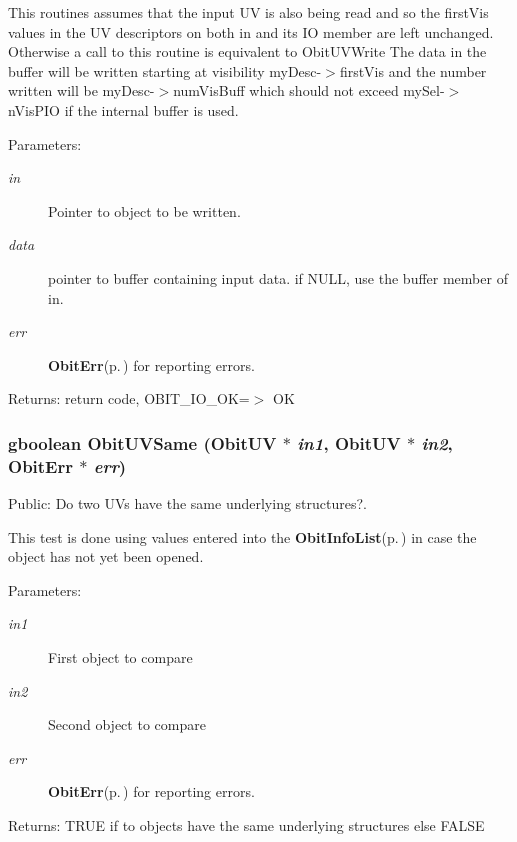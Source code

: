 This routines assumes that the input UV is also being read and so the first\-Vis values in the UV descriptors on both in and its IO member are left unchanged. Otherwise a call to this routine is equivalent to Obit\-UVWrite The data in the buffer will be written starting at visibility my\-Desc-$>$first\-Vis and the number written will be my\-Desc-$>$num\-Vis\-Buff which should not exceed my\-Sel-$>$n\-Vis\-PIO if the internal buffer is used. \begin{Desc}
\item[Parameters:]
\begin{description}
\item[{\em in}]Pointer to object to be written. \item[{\em data}]pointer to buffer containing input data. if NULL, use the buffer member of in. \item[{\em err}]{\bf Obit\-Err}{\rm (p.\,\pageref{structObitErr})} for reporting errors. \end{description}
\end{Desc}
\begin{Desc}
\item[Returns:]return code, OBIT\_\-IO\_\-OK=$>$ OK \end{Desc}
\subsubsection{\setlength{\rightskip}{0pt plus 5cm}gboolean Obit\-UVSame ({\bf Obit\-UV} $\ast$ {\em in1}, {\bf Obit\-UV} $\ast$ {\em in2}, {\bf Obit\-Err} $\ast$ {\em err})}\label{ObitUV_8h_a33}


Public: Do two UVs have the same underlying structures?. 

This test is done using values entered into the {\bf Obit\-Info\-List}{\rm (p.\,\pageref{structObitInfoList})} in case the object has not yet been opened. \begin{Desc}
\item[Parameters:]
\begin{description}
\item[{\em in1}]First object to compare \item[{\em in2}]Second object to compare \item[{\em err}]{\bf Obit\-Err}{\rm (p.\,\pageref{structObitErr})} for reporting errors. \end{description}
\end{Desc}
\begin{Desc}
\item[Returns:]TRUE if to objects have the same underlying structures else FALSE \end{Desc}
